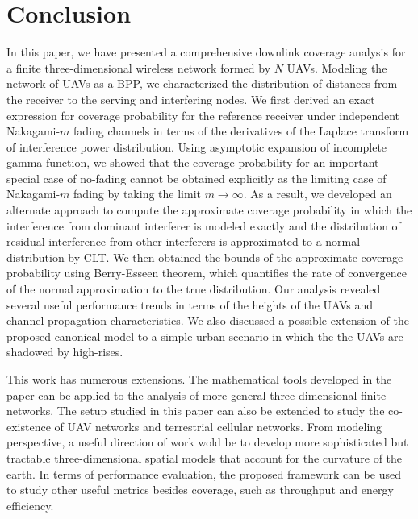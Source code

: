 \documentclass[journal,draftclsnofoot,onecolumn,12pt]{IEEEtran}
\begin{document}
\section{Conclusion}
In this paper, we have presented a comprehensive downlink coverage analysis for a finite three-dimensional wireless network formed by $N$ UAVs. Modeling the network of UAVs as a BPP, we characterized the distribution of distances from the receiver to the serving and interfering nodes. We first derived an exact expression for coverage probability for the reference receiver under independent Nakagami-$m$ fading channels in terms of the derivatives of the Laplace transform of interference power distribution. Using asymptotic expansion of incomplete gamma function, we showed that the coverage probability for an important special case of no-fading cannot be obtained explicitly as the limiting case of Nakagami-$m$ fading by taking the limit $m \to \infty$. As a result, we developed an alternate approach to compute the approximate coverage probability in which the interference from dominant interferer is modeled exactly and the distribution of residual interference from other interferers is approximated to a normal distribution by CLT. We then obtained the bounds of the approximate coverage probability using  Berry-Esseen theorem, which quantifies the rate of convergence of the normal approximation to the true distribution. Our analysis revealed several useful performance trends in terms of the heights of the UAVs and channel propagation characteristics. We also discussed a possible extension of the proposed canonical model to a simple urban scenario in which the the UAVs are shadowed by high-rises. 

This work has numerous extensions. The mathematical tools developed in the paper can be applied to the analysis of more general three-dimensional finite networks. The setup studied in this paper can also be extended to study the co-existence of UAV networks and terrestrial cellular networks. From modeling perspective, a useful direction of work wold be to develop more sophisticated but tractable three-dimensional spatial models that account for the curvature of the earth. In terms of performance evaluation, the proposed framework can be used to study other useful metrics besides coverage, such as throughput and energy efficiency.

\end{document}
